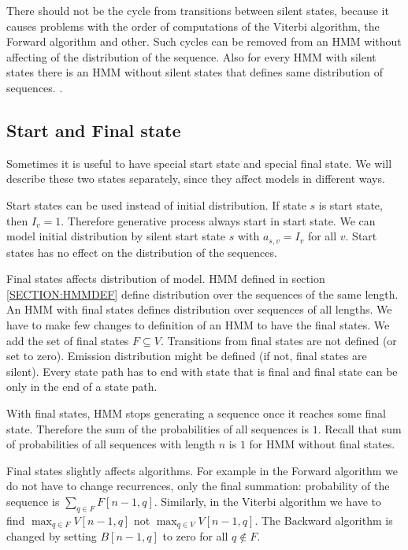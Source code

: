 There should not be the cycle from transitions between silent states, because it
causes problems with the order of computations of the Viterbi algorithm, the
Forward algorithm and other. Such cycles can be removed from an HMM without
affecting of the distribution of the sequence. Also for every HMM with silent
states there is an HMM without silent states that defines same distribution of
sequences. \cite{Nanasi2010mgr}.


\subsection{Start and Final state}

Sometimes it is useful to have special start state and special final state. We
will describe these two states separately, since they affect models in different
ways. 

Start states can be used instead of initial distribution. If state $s$ is start
state, then $I_v=1$. Therefore generative process always start in start state.
We can model initial distribution by silent start state $s$ with $a_{s,v}=I_v$
for all $v$. Start states has no effect on the distribution of the sequences.

Final states affects distribution of model. HMM defined in section
\ref{SECTION:HMMDEF} define distribution over the sequences of the same length.
An HMM with
final states defines distribution over sequences of all lengths.  We have to make
few changes to definition of an HMM to have the final states.
We add the set of final states $F\subseteq V$. Transitions from final states are not
defined (or set to zero). Emission distribution might be defined (if not, final
states are silent). Every state path has to end with state that is final and
final state can be only in the end of a state path.

With final states, HMM stops generating a sequence once it reaches some final
state. Therefore the sum of the probabilities of all sequences is $1$. Recall
that sum of probabilities of all sequences with length $n$ is $1$ for HMM
without final states.

Final states slightly affects algorithms. For example in the Forward algorithm we do
not have to change recurrences, only the final summation: probability of the sequence is $\sum_{q\in F}F[n-1,q]$. 
Similarly, in the Viterbi algorithm
we have to find $\max_{q\in F} V[n-1,q]$ not $\max_{q\in V} V[n-1,q]$. 
The Backward algorithm is changed by setting $B[n-1,q]$ to zero for all $q\notin F$.

